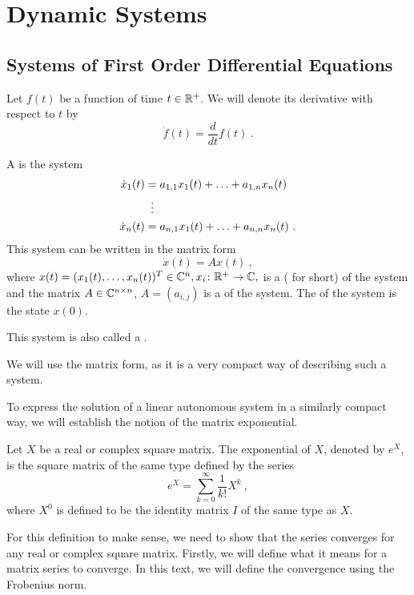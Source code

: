\chapter{Dynamic Systems}
\label{chap:intr}

\section{Systems of First Order Differential Equations}

\begin{remark}
	Let $f(t)$ be a function of time $t\in\mathbb{R}^+$. We will denote its derivative with respect to $t$ by $$\dot{f}(t)=\frac{d}{dt}f(t)\ .$$
\end{remark}

\begin{definition}
	A  is the system 
	\begin{align*}
		\dot{x}_1(t)&=a_{1,1}x_1(t)+\ldots+a_{1,n}x_n(t) \\
		&\vdotswithin{=} \\
		\dot{x}_n(t)&=a_{n,1}x_1(t)+\ldots+a_{n,n}x_n(t)\ .
	\end{align*}
	This system can be written in the matrix form $$\dot{x}(t)=Ax(t)\ ,$$ where $x(t)=(x_1(t),\ldots,x_n(t))^T \in \mathbb{C}^n, x_i\colon\mathbb{R}^+\to\mathbb{C},$ is a  ( for short) of the system and the matrix $A\in \mathbb{C}^{n\times n}$, $A=(a_{i,j})$ is a  of the system. The  of the system is the state $x(0)$.

	This system is also called a .
\end{definition}

We will use the matrix form, as it is a very compact way of describing such a system.

To express the solution of a linear autonomous system in a similarly compact way, we will establish the notion of the matrix exponential.

\begin{definition}
	Let $X$ be a real or complex square matrix. The exponential of $X$, denoted by $e^X$, is the square matrix of the same type defined by the series $$e^{X}=\sum _{k=0}^{\infty}\frac{1}{k!}X^{k}\ ,$$
	where $X^0$ is defined to be the identity matrix $I$ of the same type as $X$.
\end{definition}

For this definition to make sense, we need to show that the series converges for any real or complex square matrix. Firstly, we will define what it means for a matrix series to converge. In this text, we will define the convergence using the Frobenius norm.

